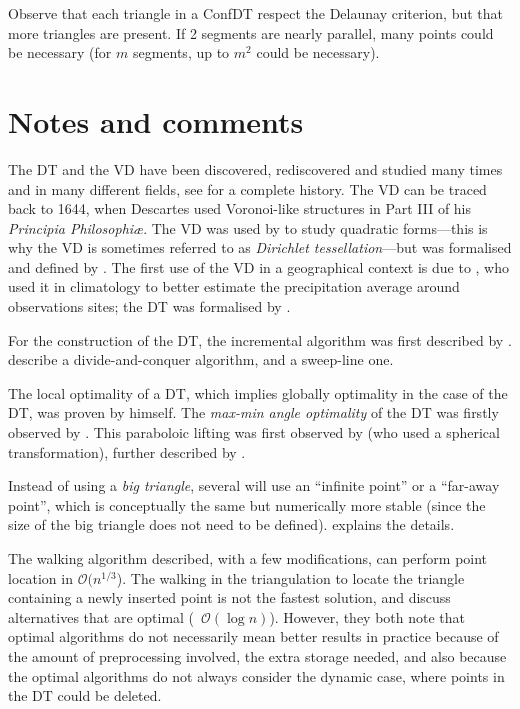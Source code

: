Observe that each triangle in a ConfDT respect the Delaunay criterion, but that more triangles are present. 
If 2 segments are nearly parallel, many points could be necessary (for $m$ segments, up to $m^2$ could be necessary).


%
\section{Notes and comments}%
\label{sec:notes}

The DT and the VD have been discovered, rediscovered and studied many times and in many different fields, see \citet{Okabe00} for a complete history.
The VD can be traced back to 1644, when Descartes used Voronoi-like structures in Part III of his \emph{Principia Philosophi\ae}. 
The VD was used by \citet{Dirichlet50} to study quadratic forms---this is why the VD is sometimes referred to as \emph{Dirichlet tessellation}---but was formalised and defined by \citet{Voronoi08}. 
The first use of the VD in a geographical context is due to \citet{Thiessen11}, who used it in climatology to better estimate the precipitation average around observations sites; the DT was formalised by \citet{Delaunay34}. 

For the construction of the DT, the incremental algorithm was first described by \citet{Lawson72-1}.
\citet{Guibas85} describe a divide-and-conquer algorithm, and \citet{Fortune87} a sweep-line one.

The local optimality of a DT, which implies globally optimality in the case of the DT, was proven by \citet{Delaunay34} himself.
The \emph{max-min angle optimality} of the DT was firstly observed by \citet{Sibson78}.
This paraboloic lifting was first observed by \citet{Brown79} (who used a spherical transformation), further described by \citet{Seidel82,Edelsbrunner86}. 

Instead of using a \emph{big triangle}, several will use an ``infinite point'' or a ``far-away point'', which is conceptually the same but numerically more stable (since the size of the big triangle does not need to be defined).
\citet{Liu05-1} explains the details.

The walking algorithm described, with a few modifications, can perform point location in $\mathcal{O}(n^{1/3}$).
The walking in the triangulation to locate the triangle containing a newly inserted point is not the fastest solution, \citet{Mucke99} and \citet{Devillers02} discuss alternatives that are optimal (\ie\ $\mathcal{O}(\log n)$).
However, they both note that optimal algorithms do not necessarily mean better results in practice because of the amount of preprocessing involved, the extra storage needed, and also because the optimal algorithms do not always consider the dynamic case, where points in the DT could be deleted. 

